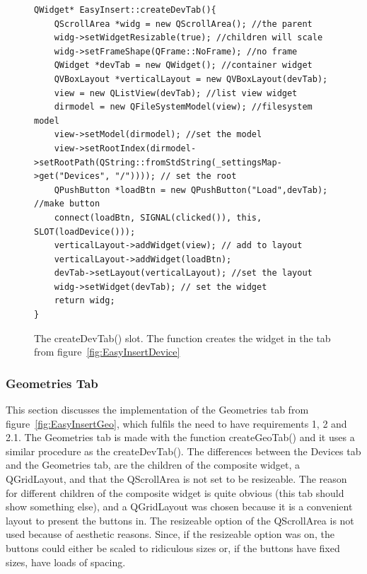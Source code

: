 \begin{figure}[h] %
\centering
\lstset{language=C++} 
\begin{lstlisting}[frame=single]  
QWidget* EasyInsert::createDevTab(){
	QScrollArea *widg = new QScrollArea(); //the parent 
	widg->setWidgetResizable(true); //children will scale 
	widg->setFrameShape(QFrame::NoFrame); //no frame 
	QWidget *devTab = new QWidget(); //container widget
	QVBoxLayout *verticalLayout = new QVBoxLayout(devTab); 
	view = new QListView(devTab); //list view widget
	dirmodel = new QFileSystemModel(view); //filesystem model
	view->setModel(dirmodel); //set the model
	view->setRootIndex(dirmodel->setRootPath(QString::fromStdString(_settingsMap->get("Devices", "/")))); // set the root
	QPushButton *loadBtn = new QPushButton("Load",devTab); //make button
	connect(loadBtn, SIGNAL(clicked()), this, SLOT(loadDevice())); 
	verticalLayout->addWidget(view); // add to layout
	verticalLayout->addWidget(loadBtn);
	devTab->setLayout(verticalLayout); //set the layout
	widg->setWidget(devTab); // set the widget
	return widg;
}
\end{lstlisting}
\caption{The createDevTab() slot. The function creates the widget in the tab from figure~\ref{fig:EasyInsertDevice}}
\label{fig:deviceTabCode} 	
\end{figure}

\subsubsection{Geometries Tab}
\label{sec:GeoTab}
This section discusses the implementation of the Geometries tab from figure~\ref{fig:EasyInsertGeo}, which fulfils the need to have requirements 1, 2 and 2.1. The Geometries tab is made with the function createGeoTab() and it uses a similar procedure as the createDevTab(). The differences between the Devices tab and the Geometries tab, are the children of the composite widget, a QGridLayout, and that the QScrollArea is not set to be resizeable. The reason for different children of the composite widget is quite obvious (this tab should show something else), and a QGridLayout was chosen because it is a convenient layout to present the buttons in. The resizeable option of the QScrollArea is not used because of aesthetic reasons. Since, if the resizeable option was on, the buttons could either be scaled to ridiculous sizes or, if the buttons have fixed sizes, have loads of spacing. 

